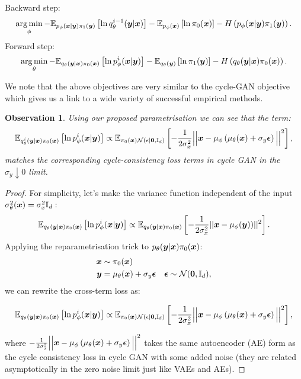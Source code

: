 \documentclass[a4paper,12pt,twoside,openright]{report}
\newtheorem{observation}{Observation}
\theoremstyle{definition}
\begin{document}
Backward step:
\begin{align*}
\operatorname*{arg\,min}_\phi- \mathbb{E}_{p_{\phi}({\bm{x}}|{\bm{y}})\pi_1({\bm{y}})}\left[  \operatorname{ln}  q^{i-1}_{\theta}({\bm{y}}|{\bm{x}})\right] -  \mathbb{E}_{p_{\phi}({\bm{x}})}\left[ \operatorname{ln}  \pi_0({\bm{x}}) \right] - H\left(p_{\phi}({\bm{x}}|{\bm{y}})\pi_1({\bm{y}})\right).
\end{align*}
Forward step:
\begin{align*}
\operatorname*{arg\,min}_\theta- \mathbb{E}_{q_{\theta}({\bm{y}}|{\bm{x}})\pi_0({\bm{x}})}\left[  \operatorname{ln}  p^i_{\phi}({\bm{x}}|{\bm{y}})\right] -  \mathbb{E}_{q_{\theta}({\bm{y}})}\left[ \operatorname{ln}  \pi_1({\bm{y}}) \right] - H\left(q_{\theta}({\bm{y}}|{\bm{x}})\pi_0({\bm{x}})\right).
\end{align*}

We note that the above objectives are very similar to the cycle-GAN \citep{zhu2017unpaired} objective which gives us a link to a wide variety of successful empirical methods.

\begin{observation}\label{obs:cycle}
Using our proposed parametrisation we can see that the term:
$$\mathbb{E}_{q^i_{\theta}({\bm{y}}|{\bm{x}})\pi_0({\bm{x}})}\left[  \operatorname{ln}  p^i_{\phi}({\bm{x}}|{\bm{y}})\right] \propto \mathbb{E}_{\pi_0({\bm{x}}){\mathcal{N}}(\epsilon|\textbf{0},{\mathbb{I}_d} )}\left[  -  \frac{1}{2\sigma_x^2}\Big|\Big|{\bm{x}}- \mu_\phi\left(\mu_\theta({\bm{x}}) + \sigma_y \bm{\epsilon}\right) \Big|\Big|^2\right],$$
matches the corresponding cycle-consistency loss terms in cycle GAN \cite{zhu2017unpaired} in the $\sigma_y \downarrow 0$ limit.
\end{observation}
\begin{proof}

For simplicity, let's make the variance function independent of the input $\sigma^2_{\theta}({\bm{x}}) = \sigma_{x}^2 {\mathbb{I}_d}:$ 
\begin{align*}
\mathbb{E}_{q_{\theta}({\bm{y}}|{\bm{x}})\pi_0({\bm{x}})}\left[  \operatorname{ln}  p^i_{\phi}({\bm{x}}|{\bm{y}})\right] \propto \mathbb{E}_{q_{\theta}({\bm{y}}|{\bm{x}})\pi_0({\bm{x}})}\left[  -  \frac{1}{2\sigma_x^2}||{\bm{x}}- {\mu}_{\phi}({\bm{y}}))||^2\right].
\end{align*}
Applying the reparametrisation trick \cite{kingma2013auto} to $p_{\theta}({\bm{y}}|{\bm{x}})\pi_0({\bm{x}})$: 
\begin{align*}
    {\bm{x}} &\sim \pi_0({\bm{x}}) \\
    {\bm{y}} &= {\mu}_{\theta}({\bm{x}}) + \sigma_y \bm{\epsilon} \quad \bm{\epsilon} \sim {\mathcal{N}}(\textbf{0}, {\mathbb{I}_d}),
\end{align*}
we can rewrite the cross-term loss as: 

\begin{align*}
 \mathbb{E}_{q_{\theta}({\bm{y}}|{\bm{x}})\pi_0({\bm{x}})}\left[  \operatorname{ln}  p^i_{\phi}({\bm{x}}|{\bm{y}})\right] \propto \mathbb{E}_{\pi_0({\bm{x}}){\mathcal{N}}(\epsilon|\textbf{0},{\mathbb{I}_d} )}\left[  -  \frac{1}{2\sigma_x^2}\Big|\Big|{\bm{x}}- \mu_\phi\left(\mu_\theta({\bm{x}}) + \sigma_y \bm{\epsilon}\right) \Big|\Big|^2\right],
\end{align*}

where $ -  \frac{1}{2\sigma_x^2}\Big|\Big|{\bm{x}}- \mu_\phi\left(\mu_\theta({\bm{x}}) + \sigma_y \bm{\epsilon}\right) \Big|\Big|^2$ takes the same autoencoder (AE) form as the cycle consistency loss in cycle GAN with some added noise (they are related asymptotically in the zero noise limit just like VAEs and AEs).
\end{proof}
\end{document}
